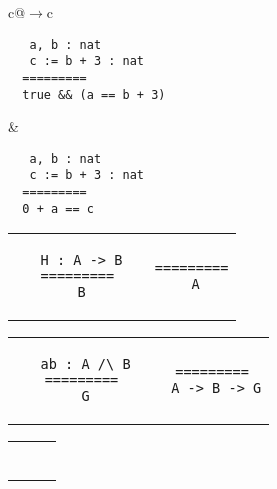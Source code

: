 \begin{landscape}
\begin{small}
\begin{multicols*}{3}[\begin{center}\section*{}\end{center}]
\begin{tabular}{c@{$\to$}c}
  \end{tabular}
  \begin{tabular}{c@{$\to$}c}
  \begin{minipage}{0.15\textwidth}\begin{lstlisting}
   a, b : nat
   c := b + 3 : nat
  =========
  true && (a == b + 3)
  \end{lstlisting}\end{minipage}
  &
  \begin{minipage}{0.15\textwidth}\begin{lstlisting}
   a, b : nat
   c := b + 3 : nat
  =========
  0 + a == c
  \end{lstlisting}\end{minipage}
  \end{tabular}
  \begin{tabular}{c@{$\to$}c}
  \begin{minipage}{0.15\textwidth}\begin{lstlisting}
   H : A -> B
  =========
   B
  \end{lstlisting}\end{minipage}
  &
  \begin{minipage}{0.15\textwidth}\begin{lstlisting}
  =========
   A
  \end{lstlisting}\end{minipage}
  \end{tabular}
  \begin{tabular}{c@{$\to$}c}
  \begin{minipage}{0.15\textwidth}\begin{lstlisting}
   ab : A /\ B
  =========
   G
  \end{lstlisting}\end{minipage}
  &
  \begin{minipage}{0.15\textwidth}\begin{lstlisting}
  =========
   A -> B -> G
  \end{lstlisting}\end{minipage}
  \end{tabular}
  \begin{tabular}{c@{$\to$}cc}
  \begin{minipage}{0.10\textwidth}\begin{lstlisting}

\end{lstlisting}
\end{minipage}
\end{tabular}
\end{multicols*}
\end{small}
\end{landscape}
